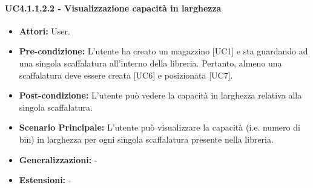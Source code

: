 \paragraph{UC4.1.1.2.2 - Visualizzazione capacità in larghezza}
\begin{itemize}
    \item \textbf{Attori:} User.
    \item \textbf{Pre-condizione:} L'utente ha creato un magazzino [UC1] e sta guardando ad una singola scaffalatura all'interno della libreria. Pertanto, almeno una scaffalatura deve essere creata [UC6] e posizionata [UC7].
    \item \textbf{Post-condizione:} L'utente può vedere la capacità in larghezza relativa alla singola scaffalatura.
    \item \textbf{Scenario Principale:}  L'utente può visualizzare la capacità (i.e. numero di bin) in larghezza per ogni singola scaffalatura presente nella libreria.
    \item \textbf{Generalizzazioni:} -
    \item \textbf{Estensioni:} -
\end{itemize}


